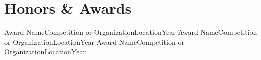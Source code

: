 \section{Honors \& Awards}
  \resumeSubHeadingListStart
    \resumeAwardItem
      {Award Name}{Competition or Organization}{Location}{Year}
    \resumeAwardItem
      {Award Name}{Competition or Organization}{Location}{Year}
    \resumeAwardItem
      {Award Name}{Competition or Organization}{Location}{Year}
  \resumeSubHeadingListEnd

